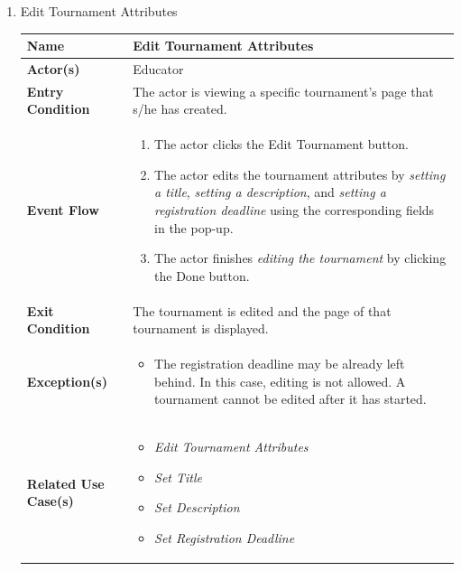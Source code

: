 \begin{enumerate}
\item Edit Tournament Attributes
\begin{center}
    \begin{tabular}{ | m{10em} | m{10cm}| } 
      \hline
      \textbf{Name} & Edit Tournament Attributes \\ 
      \hline
      \textbf{Actor(s)} & Educator \\ 
      \hline
      \textbf{Entry Condition} & The actor is viewing a specific tournament's page that s/he has created. \\ 
      \hline
      \textbf{Event Flow} & 
          \begin{enumerate}[(1)]
              \item The actor clicks the Edit Tournament button.
              \item The actor edits the tournament attributes by \textit{setting a title}, \textit{setting a description}, and \textit{setting a registration deadline} using the corresponding fields in the pop-up.
              \item The actor finishes \textit{editing the tournament} by clicking the Done button.
          \end{enumerate}
      \\ 
      \hline
      \textbf{Exit Condition} & The tournament is edited and the page of that tournament is displayed.  \\ 
      \hline
      \textbf{Exception(s)} & 
      \begin{itemize}
          \item The registration deadline may be already left behind. In this case, editing is not allowed. A tournament cannot be edited after it has started.
      \end{itemize}
          \\ 
      \hline
      \textbf{Related Use Case(s)} & 
      \begin{itemize}
          \item \textit{Edit Tournament Attributes}
          \item \textit{Set Title}
          \item \textit{Set Description}
          \item \textit{Set Registration Deadline}
      \end{itemize}
          \\ 
      \hline
    \end{tabular}
\end{center}


\end{enumerate}
